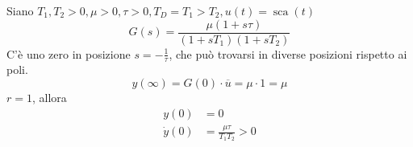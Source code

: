 \documentclass[10pt,a4paper]{book}
\DeclareMathOperator{\sca}{sca}
\begin{document}
Siano $T_1 ,T_2  >0,\mu  >0,\tau  >0,T_D =T_1  >T_2 ,u(t) =\sca(t)$
\begin{equation*}
	G(s)=\frac{\mu (1+s\tau)}{(1+sT_1)(1+sT_2)}
\end{equation*}
C'è uno zero in posizione $s=-\frac{1}{\tau }$, che può trovarsi in diverse posizioni rispetto ai poli.
\begin{equation*}
	y(\infty) =G(0) \cdotp \overline{u} =\mu \cdotp 1=\mu 
\end{equation*}
$r=1$, allora
\begin{equation*}
	\begin{aligned}
		y(0)        & =0                             \\
		\dot{y} (0) & =\frac{\mu \tau }{T_1 T_2}  >0 
	\end{aligned}
\end{equation*}
\end{document}

